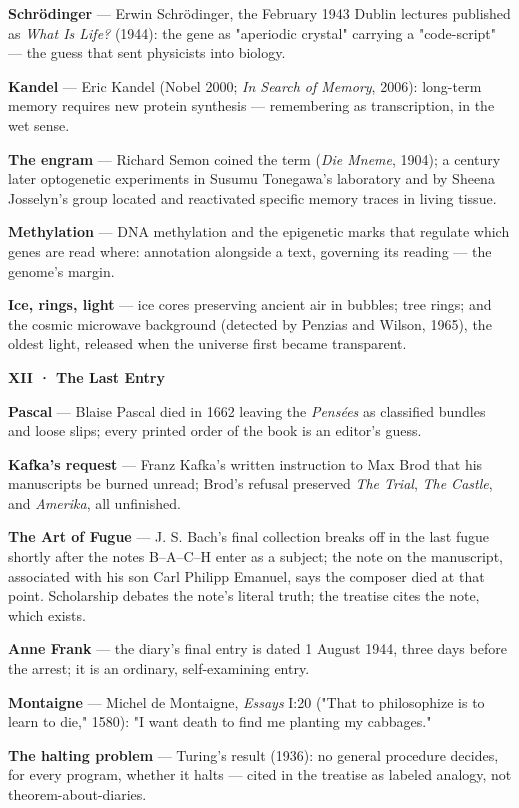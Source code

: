 \documentclass[11pt]{article}
\begin{document}
\textbf{Schrödinger} — Erwin Schrödinger, the February 1943 Dublin lectures published as \emph{What Is Life?} (1944): the gene as "aperiodic crystal" carrying a "code-script" — the guess that sent physicists into biology.

\textbf{Kandel} — Eric Kandel (Nobel 2000; \emph{In Search of Memory}, 2006): long-term memory requires new protein synthesis — remembering as transcription, in the wet sense.

\textbf{The engram} — Richard Semon coined the term (\emph{Die Mneme}, 1904); a century later optogenetic experiments in Susumu Tonegawa's laboratory and by Sheena Josselyn's group located and reactivated specific memory traces in living tissue.

\textbf{Methylation} — DNA methylation and the epigenetic marks that regulate which genes are read where: annotation alongside a text, governing its reading — the genome's margin.

\textbf{Ice, rings, light} — ice cores preserving ancient air in bubbles; tree rings; and the cosmic microwave background (detected by Penzias and Wilson, 1965), the oldest light, released when the universe first became transparent.

\textbf{XII · The Last Entry}

\textbf{Pascal} — Blaise Pascal died in 1662 leaving the \emph{Pensées} as classified bundles and loose slips; every printed order of the book is an editor's guess.

\textbf{Kafka's request} — Franz Kafka's written instruction to Max Brod that his manuscripts be burned unread; Brod's refusal preserved \emph{The Trial}, \emph{The Castle}, and \emph{Amerika}, all unfinished.

\textbf{The Art of Fugue} — J. S. Bach's final collection breaks off in the last fugue shortly after the notes B–A–C–H enter as a subject; the note on the manuscript, associated with his son Carl Philipp Emanuel, says the composer died at that point. Scholarship debates the note's literal truth; the treatise cites the note, which exists.

\textbf{Anne Frank} — the diary's final entry is dated 1 August 1944, three days before the arrest; it is an ordinary, self-examining entry.

\textbf{Montaigne} — Michel de Montaigne, \emph{Essays} I:20 ("That to philosophize is to learn to die," 1580): "I want death to find me planting my cabbages."

\textbf{The halting problem} — Turing's result (1936): no general procedure decides, for every program, whether it halts — cited in the treatise as labeled analogy, not theorem-about-diaries.
\end{document}
